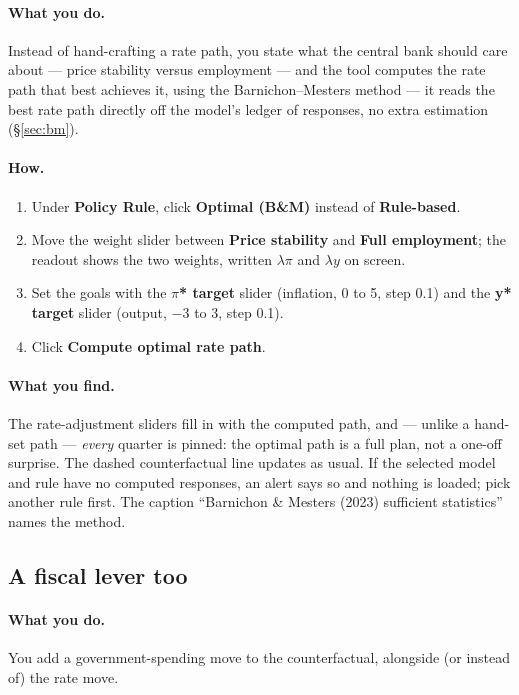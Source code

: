 \documentclass[11pt]{article}
\theoremstyle{definition}
\theoremstyle{remark}
\begin{document}
\paragraph{What you do.} Instead of hand-crafting a rate path, you state what
the central bank should care about --- price stability versus employment ---
and the tool computes the rate path that best achieves it, using the
Barnichon--Mesters method --- it reads the best rate path directly off the
model's ledger of responses, no extra estimation (\S\ref{sec:bm}).

\paragraph{How.}
\begin{enumerate}
  \item Under \textbf{Policy Rule}, click \textbf{Optimal (B\&M)} instead of
    \textbf{Rule-based}.
  \item Move the weight slider between \textbf{Price stability} and
    \textbf{Full employment}; the readout shows the two weights, written
    $\lambda\pi$ and $\lambda y$ on screen.
  \item Set the goals with the \textbf{$\pi$* target} slider (inflation, 0 to
    5, step 0.1) and the \textbf{y* target} slider (output, $-3$ to $3$,
    step 0.1).
  \item Click \textbf{Compute optimal rate path}.
\end{enumerate}

\paragraph{What you find.} The rate-adjustment sliders fill in with the
computed path, and --- unlike a hand-set path --- \emph{every} quarter is
pinned: the optimal path is a full plan, not a one-off surprise. The dashed
counterfactual line updates as usual. If the selected model and rule have no
computed responses, an alert says so and nothing is loaded; pick another
rule first. The caption ``Barnichon \& Mesters (2023) sufficient statistics''
names the method.

\subsection{A fiscal lever too}

\paragraph{What you do.} You add a government-spending move to the
counterfactual, alongside (or instead of) the rate move.
\end{document}
